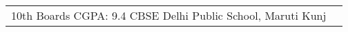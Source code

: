 \documentclass[10pt]{article} %
\begin{document}
\begin{paracol}{2}
\begin{supertabular}{rl}

	{10th Boards} %
	{CGPA: 9.4} %
	{CBSE} %
	{Delhi Public School, Maruti Kunj} %


\end{supertabular}









%
%
%
%
%
%
%
%
%


\end{paracol}
\end{document}
